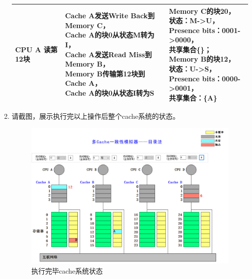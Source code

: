 \documentclass{ctexart}
\makeatletter
\newcommand{\tabincell}[2]{\begin{tabular}{@{}#1@{}}#2\end{tabular}}
\makeatother
\begin{document}
\begin{enumerate}
\begin{longtable}{|l|l|l|}
        CPU A 读第12块 & \tabincell{l}{Cache A发送Write Back到Memory C，\\Cache A的块0从状态M转为I，\\Cache A发送Read Miss到Memory B，\\Memory B传输第12块到Cache A，\\Cache A的块0从状态I转为S}                                      & \tabincell{l}{Memory C的块20，\\状态：M-\textgreater{}U，\\Presence bits：0001-\textgreater{}0000，\\共享集合\{\}；\\Memory B的块12，\\状态：U-\textgreater{}S，\\Presence bits：0000-\textgreater{}0001，\\共享集合：\{A\}}  \\ \hline
        
        \end{longtable}
    \item 请截图，展示执行完以上操作后整个cache系统的状态。
    \par \begin{figure}[H]
        \centering
        \includegraphics[scale=0.3]{mlf.png}
        \caption{执行完毕cache系统状态}
    \end{figure}
\end{enumerate}
\end{document}
